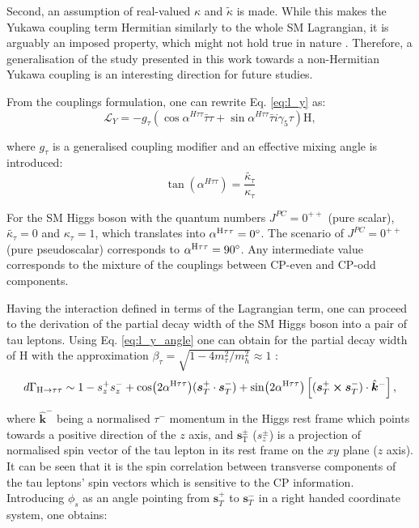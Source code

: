 Second, an assumption of real-valued $\kappa$ and $\tilde{\kappa}$ is made. While this makes the Yukawa coupling term Hermitian similarly to the whole SM Lagrangian, it is arguably an imposed property, which might not hold true in nature \cite{Mannheim:2021kjs}. Therefore, a generalisation of the study presented in this work towards a non-Hermitian Yukawa coupling \cite{Korchin:2016rsf, Korchin:2021xxl} is an interesting direction for future studies.

From the couplings formulation, one can rewrite Eq. \ref{eq:l_y} as:
\begin{equation}\label{eq:l_y_angle}
    \mathcal{L}_Y = -g_\tau(\cos\alpha^{H\tau\tau}\bar{\tau}\tau + \sin\alpha^{H\tau\tau}\bar{\tau}i\gamma_5\tau)\text{H},
\end{equation}

where $g_\tau$ is a generalised coupling modifier and an effective mixing angle is introduced:
\begin{equation}\label{eq:mixa}
    \tan(\alpha^{H\tau\tau}) = \frac{\tilde{\kappa_\tau}}{\kappa_\tau}
\end{equation}

For the SM Higgs boson with the quantum numbers $J^{PC} = 0^{++}$ (pure scalar), $\tilde{\kappa_\tau} = 0$ and $\kappa_\tau = 1$, which translates into $\alpha^{\text{H}\tau\tau} = 0^\circ$. The scenario of $J^{PC} = 0^{++}$ (pure pseudoscalar) corresponds to $\alpha^{\text{H}\tau\tau} = 90^\circ$. Any intermediate value corresponds to the mixture of the couplings between CP-even and CP-odd components.

Having the interaction defined in terms of the Lagrangian term, one can proceed to the derivation of the partial decay width of the SM Higgs boson into a pair of tau leptons. Using Eq. \ref{eq:l_y_angle} one can obtain for the partial decay width of H with the approximation $\beta_\tau = \sqrt{1-4m_\tau^2/m_h^2}\approx1$ \cite{Berge:2014wta}:
\begin{equation}
    d\Gamma_{\text{H} \rightarrow \tau\tau} \sim 1 - s^+_zs^-_z + \cos(2\alpha^{\text{H}\tau\tau})(\boldsymbol{s}_T^+\cdot \boldsymbol{s}_T^-) + \sin(2\alpha^{\text{H}\tau\tau})\left[(\boldsymbol{s}_T^+\cross \boldsymbol{s}_T^-)\cdot\hat{\boldsymbol{k}}^-\right ],
\end{equation}

where $\hat{\boldsymbol{k}}^-$ being a normalised $\tau^-$ momentum in the Higgs rest frame which points towards a positive direction of the $z$ axis, and $\boldsymbol{s}_\text{T}^\pm$ ($s_z^\pm$) is a projection of normalised spin vector of the tau lepton in its rest frame on the $xy$ plane ($z$ axis). It can be seen that it is the spin correlation between transverse components of the tau leptons' spin vectors which is sensitive to the CP information. Introducing $\phi_{s}$ as an angle pointing from $\boldsymbol{s}_T^+$ to $\boldsymbol{s}_T^-$ in a right handed coordinate system, one obtains:

